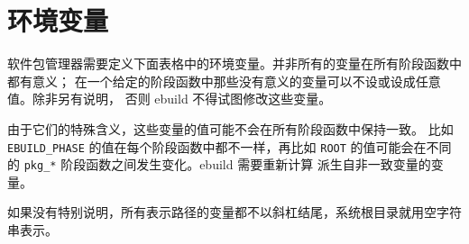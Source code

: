 \section{环境变量}
\label{sec:ebuild-env-vars}

软件包管理器需要定义下面表格中的环境变量。并非所有的变量在所有阶段函数中都有意义；
在一个给定的阶段函数中那些没有意义的变量可以不设或设成任意值。除非另有说明，
否则 ebuild 不得试图修改这些变量。

由于它们的特殊含义，这些变量的值可能不会在所有阶段函数中保持一致。
比如 \texttt{EBUILD_PHASE} 的值在每个阶段函数中都不一样，再比如 \texttt{ROOT}
的值可能会在不同的 \texttt{pkg_*} 阶段函数之间发生变化。ebuild 需要重新计算
派生自非一致变量的变量。

如果没有特别说明，所有表示路径的变量都不以斜杠结尾，系统根目录就用空字符串表示。

